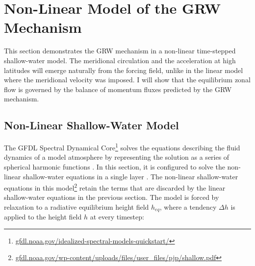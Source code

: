 


\section{Non-Linear Model of the GRW Mechanism}\label{sec:nonlin-shallow}

This section demonstrates the GRW mechanism in a non-linear time-stepped shallow-water model. The meridional circulation and the acceleration at high latitudes will emerge naturally from the forcing field, unlike in the linear model where the meridional velocity was imposed. I will show that the equilibrium zonal flow is governed by the balance of momentum fluxes predicted by the GRW mechanism.







\subsection{Non-Linear Shallow-Water Model}

The GFDL Spectral Dynamical Core\footnote{\url{gfdl.noaa.gov/idealized-spectral-models-quickstart/}} solves the equations describing the fluid dynamics of a model atmosphere by representing the solution as a series of spherical harmonic functions \citep{polvani2004numerically}. In this section, it is configured to solve the non-linear shallow-water equations in a single layer \citep{showman2011superrotation}. The non-linear shallow-water equations in this model\footnote{\url{gfdl.noaa.gov/wp-content/uploads/files/user_files/pjp/shallow.pdf}} retain the terms that are discarded by the linear shallow-water equations in the previous section. The model is forced by relaxation to a radiative equilibrium height field $h_{eq}$, where a tendency $\Delta h$ is applied to the height field $h$ at every timestep:


